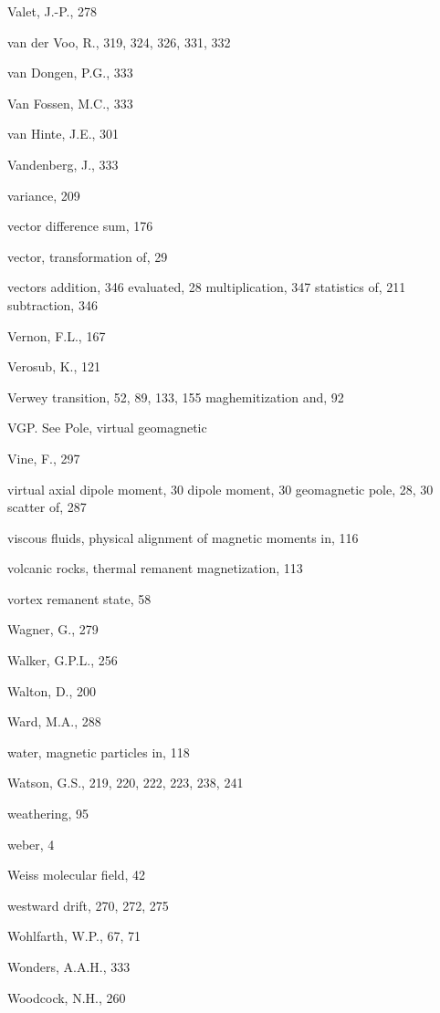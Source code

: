 \documentclass[,plain]{tauxe}
\begin{document}
\begin{theindex}
  \indexspace

  \item Valet, J.-P., 278
  \item van der Voo, R., 319, 324, 326, 331, 332
  \item van Dongen, P.G., 333
  \item Van Fossen, M.C., 333
  \item van Hinte, J.E., 301
  \item Vandenberg, J., 333
  \item variance, 209
  \item vector difference sum, 176
  \item vector, transformation of, 29
  \item vectors
    \subitem addition, 346
    \subitem evaluated, 28
    \subitem multiplication, 347
    \subitem statistics of, 211
    \subitem subtraction, 346
  \item Vernon, F.L., 167
  \item Verosub, K., 121
  \item Verwey transition, 52, 89, 133, 155
  \subitem maghemitization and, 92
  \item VGP. See Pole, virtual geomagnetic
  \item Vine, F., 297
  \item virtual
    \subitem axial dipole moment, 30
    \subitem dipole moment, 30
    \subitem geomagnetic pole, 28, 30
      \subsubitem scatter of, 287
  \item viscous fluids, physical alignment of magnetic moments in, 116
  \item volcanic rocks, thermal remanent magnetization, 113
  \item vortex remanent state, 58

  \indexspace

  \item Wagner, G., 279
  \item Walker, G.P.L., 256
  \item Walton, D., 200
  \item Ward, M.A., 288
  \item water, magnetic particles in, 118
  \item Watson, G.S., 219, 220, 222, 223, 238, 241
  \item weathering, 95
  \item weber, 4
  \item Weiss molecular field, 42
  \item westward drift, 270, 272, 275
  \item Wohlfarth, W.P., 67, 71
  \item Wonders, A.A.H., 333
  \item Woodcock, N.H., 260


\end{theindex}
\end{document}

